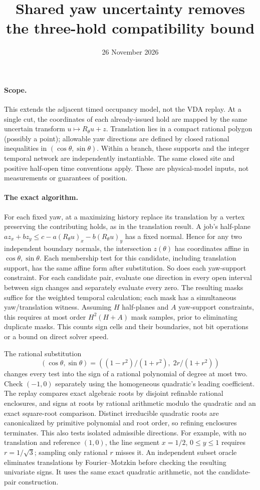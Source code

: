 \documentclass[11pt]{article}
\title{Shared yaw uncertainty removes the three-hold compatibility bound}
\date{26 November 2026}
\begin{document}
\maketitle

\paragraph{Scope.}
This extends the adjacent timed occupancy model, not the VDA replay.
At a single cut, the coordinates of each already-issued hold are mapped
by the same uncertain transform $u\mapsto R_\theta u+z$. Translation
lies in a compact rational polygon (possibly a point); allowable yaw
directions are defined by closed rational inequalities in
$(\cos\theta,\sin\theta)$. Within a branch, these supports and the
integer temporal network are independently instantiable. The same
closed site and positive half-open time conventions apply. These are
physical-model inputs, not measurements or guarantees of position.

\paragraph{The exact algorithm.}
For each fixed yaw, at a maximizing history replace its translation
by a vertex preserving the contributing holds, as in the translation
result. A job's half-plane $a z_x+b z_y\leq c-a(R_\theta u)_x-b(R_\theta u)_y$
has a fixed normal. Hence for any two independent boundary normals, the
intersection $z(\theta)$ has coordinates affine in $\cos\theta,\sin\theta$.
Each membership test for this candidate, including translation support,
has the same affine form after substitution. So does each yaw-support
constraint. For each candidate pair, evaluate one direction in every
open interval between sign changes and separately evaluate every zero.
The resulting masks suffice for the weighted temporal calculation; each
mask has a simultaneous yaw/translation witness. Assuming $H$ half-planes
and $A$ yaw-support constraints, this requires at most order
$H^2(H+A)$ mask samples, prior to eliminating duplicate masks.
This counts sign cells and their boundaries, not bit operations or a
bound on direct solver speed.

The rational substitution
\[
 (\cos\theta,\sin\theta)=((1-r^2)/(1+r^2),\;2r/(1+r^2))
\]
changes every test into the sign of a rational polynomial of degree at
most two. Check $(-1,0)$ separately using the homogeneous quadratic's
leading coefficient. The replay compares exact algebraic roots by
disjoint refinable rational enclosures, and signs at roots by rational
arithmetic modulo the quadratic and an exact square-root comparison.
Distinct irreducible quadratic roots are canonicalized by primitive
polynomial and root order, so refining enclosures terminates.
This also tests isolated admissible directions. For example, with no
translation and reference $(1,0)$, the line segment $x=1/2$,
$0\le y\le1$ requires $r=1/\sqrt{3}$; sampling only rational $r$ misses it.
An independent subset oracle eliminates translations by Fourier--Motzkin
before checking the resulting univariate signs. It uses the same exact
quadratic arithmetic, not the candidate-pair construction.
\end{document}
